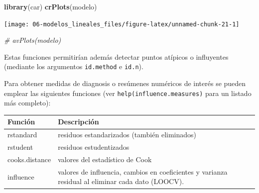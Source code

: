 \documentclass[
  spanish,
]{book}
\newenvironment{Shaded}{\begin{snugshade}}{\end{snugshade}}
\newcommand{\CommentTok}[1]{\textcolor[rgb]{0.56,0.35,0.01}{\textit{#1}}}
\newcommand{\KeywordTok}[1]{\textcolor[rgb]{0.13,0.29,0.53}{\textbf{#1}}}
\newcommand{\NormalTok}[1]{#1}
\theoremstyle{break}
\theoremstyle{definition}
\theoremstyle{definition}
\theoremstyle{definition}
\theoremstyle{remark}
\begin{document}
\begin{Shaded}
\begin{Highlighting}[]
\KeywordTok{library}\NormalTok{(car)}
\KeywordTok{crPlots}\NormalTok{(modelo)}
\end{Highlighting}
\end{Shaded}

\begin{center}\texttt{[image: 06-modelos\_lineales\_files/figure-latex/unnamed-chunk-21-1]} \end{center}

\begin{Shaded}
\begin{Highlighting}[]
\CommentTok{# avPlots(modelo)}
\end{Highlighting}
\end{Shaded}

Estas funciones permitirían además detectar puntos atípicos o influyentes
(mediante los argumentos \texttt{id.method} e \texttt{id.n}).

Para obtener medidas de diagnosis o resúmenes numéricos de interés se pueden emplear
las siguientes funciones (ver \texttt{help(influence.measures)} para un listado más completo):

\begin{longtable}[]{@{}ll@{}}
\toprule
\begin{minipage}[b]{0.10\columnwidth}\raggedright
Función\strut
\end{minipage} & \begin{minipage}[b]{0.85\columnwidth}\raggedright
Descripción\strut
\end{minipage}\tabularnewline
\midrule
\endhead
\begin{minipage}[t]{0.10\columnwidth}\raggedright
rstandard\strut
\end{minipage} & \begin{minipage}[t]{0.85\columnwidth}\raggedright
residuos estandarizados (también eliminados)\strut
\end{minipage}\tabularnewline
\begin{minipage}[t]{0.10\columnwidth}\raggedright
rstudent\strut
\end{minipage} & \begin{minipage}[t]{0.85\columnwidth}\raggedright
residuos estudentizados\strut
\end{minipage}\tabularnewline
\begin{minipage}[t]{0.10\columnwidth}\raggedright
cooks.distance\strut
\end{minipage} & \begin{minipage}[t]{0.85\columnwidth}\raggedright
valores del estadístico de Cook\strut
\end{minipage}\tabularnewline
\begin{minipage}[t]{0.10\columnwidth}\raggedright
influence\strut
\end{minipage} & \begin{minipage}[t]{0.85\columnwidth}\raggedright
valores de influencia, cambios en coeficientes y varianza residual al eliminar cada dato (LOOCV).\strut
\end{minipage}\tabularnewline
\bottomrule
\end{longtable}
\end{document}
